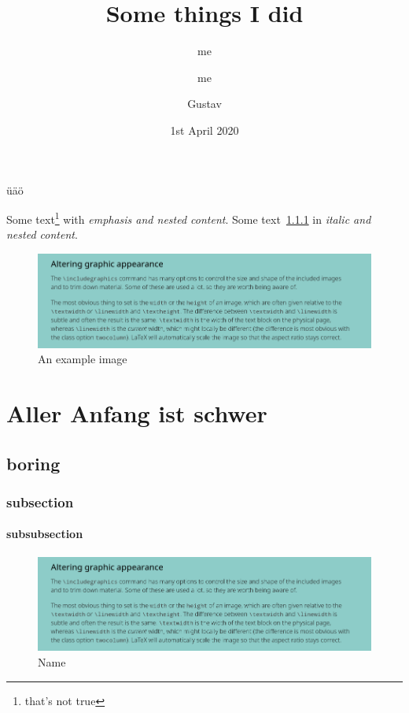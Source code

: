 \documentclass[twocolumn, chapterprefix, headings=big, numbers=enddot, ngerman]{scrreprt}
\begin{document}
\author{me \and me \and Gustav}
\title{Some things I did}
\date{1st April 2020}
\maketitle
\tableofcontents


üäö

Some text\footnote{that's not true} with \emph{emphasis and \emph{nested} content}.
Some text~\ref{subsec:labelone} in \textit{italic and \textit{nested} content}.

\begin{figure}[H]
  \centering
  \includegraphics[width=1\textwidth]{./imgs/img.png}
  \caption{An example image}
\end{figure}

\chapter{Aller Anfang ist schwer}

\section{boring}
\subsection{subsection}
\label{subsec:labelone}
\subsubsection{subsubsection}

\begin{figure}[ht]
  \centering
  \includegraphics[width=0.8\linewidth]{./imgs/img.png}
  \caption{Name}%
  \label{fig:name}
\end{figure}
\end{document}
